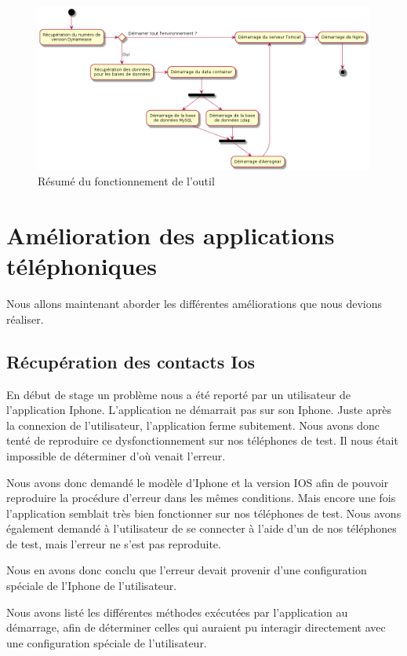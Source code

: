 \begin{figure}[!h]
	\centering
	\includegraphics[scale=0.5]{img/activity_outil.png}
	\caption{\label{activity_outil} {Résumé du fonctionnement de l'outil}}
\end{figure}


\section{Amélioration des applications téléphoniques}

Nous allons maintenant aborder les différentes améliorations que nous devions réaliser.

\subsection{Récupération des contacts Ios}

En début de stage un problème nous a été reporté par un utilisateur de l'application Iphone. L'application ne démarrait pas sur son Iphone. Juste après la connexion de l'utilisateur, l'application ferme subitement. Nous avons donc tenté de reproduire ce dysfonctionnement sur nos téléphones de test. Il nous était impossible de déterminer d'où venait l'erreur.

Nous avons donc demandé le modèle d'Iphone et la version IOS afin de pouvoir reproduire la procédure d'erreur dans les mêmes conditions. Mais encore une fois l'application semblait très bien fonctionner sur nos téléphones de test. Nous avons également demandé à l'utilisateur de se connecter à l'aide d'un de nos téléphones de test, mais l'erreur ne s'est pas reproduite.

Nous en avons donc conclu que l'erreur devait provenir d'une configuration spéciale de l'Iphone de l'utilisateur.

Nous avons listé les différentes méthodes exécutées par l'application au démarrage, afin de déterminer celles qui auraient pu interagir directement avec une configuration spéciale de l'utilisateur.

